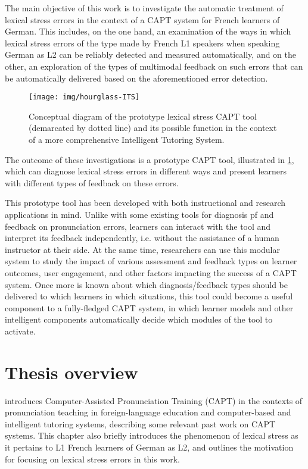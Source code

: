 The main objective of this work is to investigate the automatic treatment of lexical stress errors in the context of a CAPT system for French learners of German. This includes, on the one hand, an examination of the ways in which lexical stress errors of the type made by French L1 speakers when speaking German as L2 can be reliably detected and measured %
automatically, and on the other, an exploration of the types of multimodal feedback on such errors that can be automatically delivered based on the aforementioned error detection. 
%
	\begin{figure}[thb] 
		\centering
		\texttt{[image: img/hourglass-ITS]} 
		\caption[Conceptual diagram of the prototype lexical stress CAPT tool]{Conceptual diagram of the prototype lexical stress CAPT tool (demarcated by dotted line) and its possible function in the context of a more comprehensive Intelligent Tutoring System.}
		\label{fig:hourglass-ITS}
	\end{figure}
%
The outcome of these investigations is a prototype CAPT tool, illustrated in \cref{fig:hourglass-ITS},
which can diagnose lexical stress errors in different ways and present learners with different types of feedback on these errors.

This prototype tool has been developed with both instructional and research applications in mind.
Unlike with some existing tools for diagnosis pf and feedback on pronunciation errors, learners can interact with the tool and interpret its feedback independently, i.e. without the assistance of a human instructor at their side.
At the same time, researchers can use this modular system to study the impact of various assessment and feedback types on learner outcomes, user engagement, and other factors impacting the success of a CAPT system. 
%
Once more is known about which diagnosis/feedback types should be delivered to which learners in which situations, this tool could become a useful component to a fully-fledged CAPT system, in which learner models and other intelligent components automatically decide which modules of the tool to activate. 



\section{Thesis overview}
\label{sec:intro:overview}


 introduces Computer-Assisted Pronunciation Training (CAPT) in the contexts of pronunciation teaching in foreign-language education and computer-based and intelligent tutoring systems, describing some relevant past work on CAPT systems. This chapter also briefly 
introduces the phenomenon of lexical stress as it pertains to L1 French learners of German as L2, and outlines
the motivation for focusing on lexical stress errors in this work.

